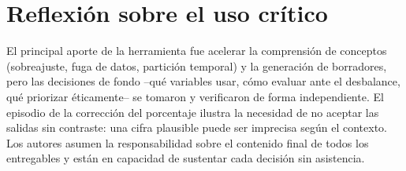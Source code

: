 \documentclass[11pt]{tg_usta}
\begin{document}
\section{Reflexión sobre el uso crítico}

El principal aporte de la herramienta fue acelerar la comprensión de conceptos (sobreajuste, fuga de datos, partición temporal) y la generación de borradores, pero las decisiones de fondo --qué variables usar, cómo evaluar ante el desbalance, qué priorizar éticamente-- se tomaron y verificaron de forma independiente. El episodio de la corrección del porcentaje ilustra la necesidad de no aceptar las salidas sin contraste: una cifra plausible puede ser imprecisa según el contexto. Los autores asumen la responsabilidad sobre el contenido final de todos los entregables y están en capacidad de sustentar cada decisión sin asistencia.
\end{document}
